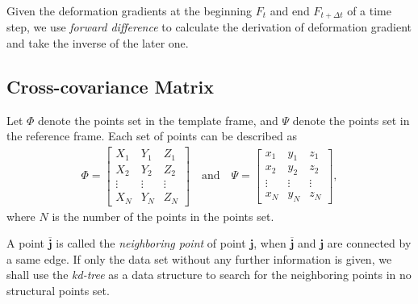 \documentclass{llncs}
\begin{document}
Given the deformation gradients at the beginning $F_t$ and end $F_{t+\Delta t}$ of a time step, we use \emph{forward difference} \cite{wilmott1995mathematics} to calculate the derivation of deformation gradient and take the inverse of the later one.  

\subsection{Cross-covariance Matrix}
\label{sec:Cross-covariance Matrix}
Let $\Phi$ denote the points set in the template frame, and $\Psi$ denote the points set in the reference frame. Each set of points can be described as
\begin{align}
\Phi=
  \begin{bmatrix}
    X_1 & Y_1 & Z_1  \\
    X_2 & Y_2 & Z_2  \\
    \vdots & \vdots & \vdots \\
    X_N & Y_N & Z_N 
  \end{bmatrix}
\quad \mbox{and} \quad
\Psi=
  \begin{bmatrix}
    x_1 & y_1 & z_1  \\
    x_2 & y_2 & z_2  \\
    \vdots & \vdots & \vdots \\
    x_N & y_N & z_N 
  \end{bmatrix},
\end{align}
where $N$ is the number of the points in the points set.

A point $\overline{\mathbf{j}}$ is called the \emph{neighboring point} of point $\mathbf{j}$, when $\overline{\mathbf{j}}$ and $\mathbf{j}$ are connected by a same edge. If only the data set without any further information is given, we shall use the \emph{kd-tree} \cite{bentley1975multidimensional} as a data structure to search for the neighboring points in no structural points set. 
\end{document}
